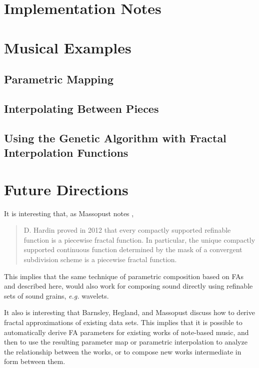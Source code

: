 \documentclass[english,11pt,letterpaper,onecolumn]{scrartcl}
\numberwithin{equation}{section}
\begin{document}
\section{Implementation Notes}

\section{Musical Examples}

\subsection{Parametric Mapping}


\subsection{Interpolating Between Pieces}


\subsection{Using the Genetic Algorithm with Fractal Interpolation Functions}

\section{Future Directions}

It is interesting that, as Massopust notes \cite{massopust2017}, 
\begin{quote}D. Hardin proved in 2012 that every compactly supported 
refinable function is a piecewise fractal function. In particular, the unique 
compactly supported continuous function determined by the mask of a convergent 
subdivision scheme is a piecewise fractal function. \end{quote} 
This implies that the same technique of parametric 
composition based on FAs and described here, would also work for composing 
sound directly using refinable sets of sound grains, \textit{e.g.} wavelets.

It also is interesting that Barnsley, Hegland, and Massopust 
\cite{2013arXiv1309.0972B} discuss how to derive fractal approximations of 
existing data sets. This implies that it is possible to automatically derive 
FA parameters for existing works of note-based music, and then to use the 
resulting parameter map or parametric interpolation to analyze the 
relationship between the works, or to compose new works intermediate in form 
between them.

% 
%
\printbibliography
\end{document}
